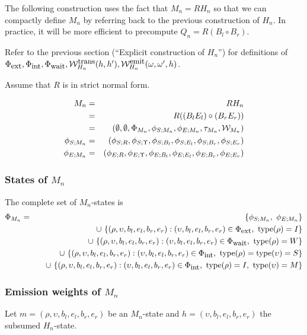 \documentclass{article}
\newcommand\compose{}
\newcommand\fork{\circ}
\newcommand\idfork{\Upsilon}
\newcommand\States{\Phi}
\newcommand\statesof[1]{\States_{#1}}
\newcommand\Transitions{\tau}
\newcommand\transitionsof[1]{\Transitions_{#1}}
\newcommand\startstateof[1]{\phi_{S;#1}}
\newcommand\laststateof[1]{\phi_{E;#1}}
\newcommand\weight{{\cal W}}
\newcommand\weightfunof[1]{\weight_{#1}}
\newcommand\transweightfun[1]{\weightfunof{#1}^{\mbox{\small trans}}}
\newcommand\emitweightfun[1]{\weightfunof{#1}^{\mbox{\small emit}}}
\newcommand\statetype{\mbox{type}}
\newcommand\stateset[1]{\statesof{\mbox{\small #1}}}
\newcommand\hstate{(\upsilon,b_l,e_l,b_r,e_r)}
\newcommand\externalsuffix{ext}
\newcommand\internalsuffix{int}
\newcommand\waitsuffix{wait}
\newcommand\externalcascades{\stateset{\externalsuffix}}
\newcommand\internalcascades{\stateset{\internalsuffix}}
\newcommand\waitstates{\stateset{\waitsuffix}}
\newcommand\mstate{(\rho,\upsilon,b_l,e_l,b_r,e_r)}
\begin{document}
The following construction uses the fact that $M_n = R \compose H_n$ so that we can compactly define $M_n$ by referring back to the previous construction of $H_n$.
In practice, it will be more efficient to precompute $Q_n = R \compose (B_l \fork B_r)$.

Refer to the previous section (``Explicit construction of $H_n$'') for definitions of
$\externalcascades,\internalcascades,\waitstates,\transweightfun{H_n}(h,h'),\emitweightfun{H_n}(\omega,\omega',h)$.

Assume that $R$ is in strict normal form.

\begin{eqnarray*}
M_n & = & R \compose H_n \\
& = & R \compose ((B_l \compose E_l) \fork (B_r \compose E_r)) \\
& = & (\emptyset,\emptyset,\statesof{M_n},\startstateof{M_n},\laststateof{M_n},\transitionsof{M_n},\weightfunof{M_n}) \\
\startstateof{M_n} & = & (\startstateof{R},\startstateof{\idfork},\startstateof{B_l},\startstateof{E_l},\startstateof{B_r},\startstateof{E_r}) \\
\laststateof{M_n} & = & (\laststateof{R},\laststateof{\idfork},\laststateof{B_l},\laststateof{E_l},\laststateof{B_r},\laststateof{E_r})
\end{eqnarray*}

\subsubsection{States of $M_n$}
The complete set of $M_n$-states is
\begin{eqnarray*}
\statesof{M_n} & = & \{ \startstateof{M_n},\ \laststateof{M_n} \} \\
& & \quad \cup\ \{ \mstate: \hstate \in \externalcascades,\ \statetype(\rho)=I \} \\
& & \quad \cup\ \{ \mstate: \hstate \in \waitstates,\ \statetype(\rho)=W \} \\
& & \quad \cup\ \{ \mstate: \hstate \in \internalcascades,\ \statetype(\rho)=\statetype(\upsilon)=S \} \\
& & \quad \cup\ \{ \mstate: \hstate \in \internalcascades,\ \statetype(\rho)=I,\ \statetype(\upsilon)=M \}
\end{eqnarray*}

\subsubsection{Emission weights of $M_n$}
Let $m = \mstate$ be an $M_n$-state and $h = \hstate$ the subsumed $H_n$-state.
\end{document}
